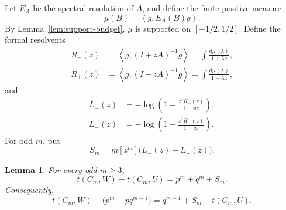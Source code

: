 \documentclass[11pt]{article}
\numberwithin{equation}{section}
\newtheorem{lemma}[theorem]{Lemma}
\newcommand{\ip}[2]{\left\langle #1,#2\right\rangle}
\begin{document}
Let $E_A$ be the spectral resolution of $A$, and define the finite positive measure
\begin{equation}\label{eq:mu}
        \mu(B)=\ip{g}{E_A(B)g}.
\end{equation}
By Lemma~\ref{lem:support-budget}, $\mu$ is supported on $[-1/2,1/2]$. Define the formal resolvents
\begin{align}
        R_-(z)&=\ip{g}{(I+zA)^{-1}g}
        =\int\frac{d\mu(\lambda)}{1+\lambda z},\label{eq:Rminus}\\
        R_+(z)&=\ip{g}{(I-zA)^{-1}g}
        =\int\frac{d\mu(\lambda)}{1-\lambda z},\label{eq:Rplus}
\end{align}
and
\begin{align}
        L_-(z)&=-\log\left(1-\frac{z^2R_-(z)}{1-pz}\right),\label{eq:Lminus}\\
        L_+(z)&=-\log\left(1-\frac{z^2R_+(z)}{1-qz}\right).\label{eq:Lplus}
\end{align}
For odd $m$, put
\begin{equation}\label{eq:Sm}
        S_m=m[z^m]\bigl(L_-(z)+L_+(z)\bigr).
\end{equation}

\begin{lemma}\label{lem:trace-identity}
For every odd $m\ge3$,
\begin{equation}\label{eq:trace-identity}
        t(C_m,W)+t(C_m,U)=p^m+q^m+S_m.
\end{equation}
Consequently,
\begin{equation}\label{eq:defect-identity}
        t(C_m,W)-\bigl(p^m-pq^{m-1}\bigr)
        =q^{m-1}+S_m-t(C_m,U).
\end{equation}
\end{lemma}
\end{document}
